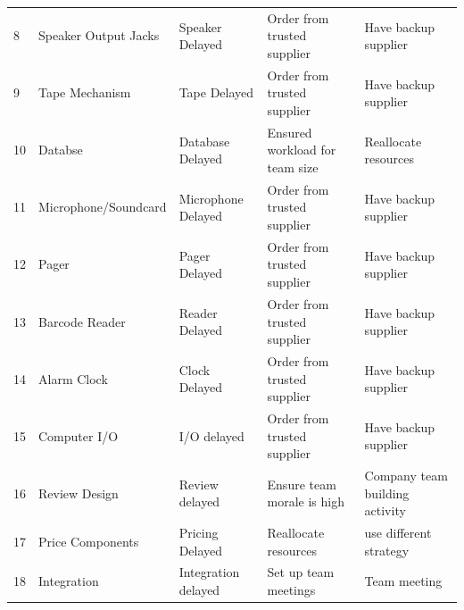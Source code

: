\documentclass{article}
\begin{document}
\begin{table}[H]
\begin{tabular}{lllll}
8        & Speaker Output Jacks          & Speaker Delayed                                                 &Order from trusted supplier                 & Have backup supplier                                                  \\
9        & Tape Mechanism                & Tape Delayed                                                    & Order from trusted supplier                    & Have backup supplier                                                  \\
10       & Databse                       & Database Delayed                                                & Ensured workload for team size                           & Reallocate resources                       \\
11       & Microphone/Soundcard          & Microphone Delayed                                              & Order from trusted supplier                      & Have backup supplier                                                  \\
12       & Pager                         & Pager Delayed                                                   & Order from trusted supplier                      & Have backup supplier                                                  \\
13       & Barcode Reader                & Reader Delayed                                                  &Order from trusted supplier                     & Have backup supplier                                                  \\
14       & Alarm Clock                   & Clock Delayed                                                   & Order from trusted supplier                     & Have backup supplier                                                  \\
15       & Computer I/O                  & I/O delayed                                                     & Order from trusted supplier                     & Have backup supplier                                                  \\
16       & Review Design                 & Review delayed              & Ensure team morale is high           & Company team building activity                                        \\
17       & Price Components              & Pricing Delayed & Reallocate resources     & use different strategy                                \\
18       & Integration                   & Integration delayed                    & Set up team meetings                                                 & Team meeting \\

\end{tabular}
\end{table}
\end{document}

